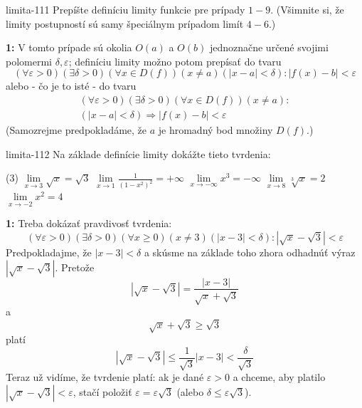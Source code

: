 \begin{defproblem}{limita-111}
Prepíšte definíciu limity funkcie pre prípady $1-9$. (Všimnite si, že limity
postupností sú samy špeciálnym prípadom limít $4-6$.)

\begin{solution}
    \textbf{1:}
    V tomto prípade sú okolia $O(a)$ a $O(b)$ jednoznačne určené svojimi
    polomermi $\delta,\varepsilon$; definíciu limity možno potom prepísať do tvaru
    \[
        (\forall \varepsilon > 0)
            (\exists \delta > 0)
                (\forall x \in D(f))
                    (x \neq a)(|x-a| < \delta):
                        |f(x)-b|<\varepsilon
    \]
    alebo - čo je to isté - do tvaru
    \begin{multline*}
        (\forall \varepsilon > 0)
            (\exists \delta > 0)
                (\forall x \in D(f))
                    (x \neq a): \\
                        (|x-a| < \delta) \Rightarrow |f(x)-b| < \varepsilon
    \end{multline*}
    (Samozrejme predpokladáme, že $a$ je hromadný bod množiny $D(f)$.)
\end{solution}
\end{defproblem}

\begin{defproblem}{limita-112}
Na základe definície limity dokážte tieto tvrdenia:
\begin{tasks}(3)
\task $\lim\limits_{x \rightarrow 3} \sqrt{x} = \sqrt{3}$
\task $\lim\limits_{x \rightarrow 1} \frac{1}{(1-x^2)^2} = +\infty$
\task $\lim\limits_{x \rightarrow -\infty}x^3 = -\infty$
\task $\lim\limits_{x \rightarrow 8} \sqrt[3]{x} = 2$
\task $\lim\limits_{x \rightarrow -2} x^2 = 4$
\end{tasks}

\begin{solution}
    \textbf{1:}
    Treba dokázať pravdivosť tvrdenia:
    \[
        (\forall \varepsilon > 0)
            (\exists \delta > 0)
                (\forall x \geq 0)
                    (x \neq 3)
                    (|x - 3| < \delta):
                    |\sqrt{x} - \sqrt{3}| < \varepsilon
    \]
    Predpokladajme, že $|x - 3| < \delta$ a skúsme na základe toho zhora
    odhadnúť výraz $|\sqrt{x} - \sqrt{3}|$. Pretože
    \[
        |\sqrt{x} - \sqrt{3}| = \frac{|x - 3|}{\sqrt{x} + \sqrt{3}}
    \]
    a
    \[
        \sqrt{x} + \sqrt{3} \geq \sqrt{3}
    \]
    platí
    \[
        |\sqrt{x} - \sqrt{3}| \leq \frac{1}{\sqrt{3}} |x - 3| < \frac{\delta}{\sqrt{3}}
    \]
    Teraz už vidíme, že tvrdenie platí: ak je dané $\varepsilon > 0$ a chceme,
    aby platilo $|\sqrt{x} - \sqrt{3}| < \varepsilon$, stačí položiť
    $\varepsilon = \varepsilon \sqrt{3}$ (alebo $\delta \leq \varepsilon
    \sqrt{3}$).
\end{solution}
\end{defproblem}

